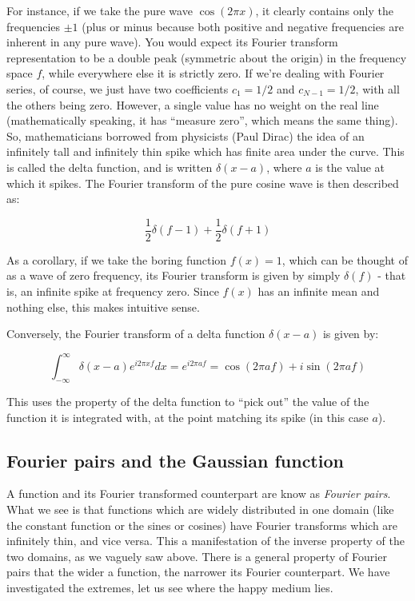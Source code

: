 \documentclass[
  letterpaper,
  DIV=11,
  numbers=noendperiod]{scrreprt}
\begin{document}
For instance, if we take the pure wave \(\cos(2\pi x)\), it clearly
contains only the frequencies \(\pm 1\) (plus or minus because both
positive and negative frequencies are inherent in any pure wave). You
would expect its Fourier transform representation to be a double peak
(symmetric about the origin) in the frequency space \(f\), while
everywhere else it is strictly zero. If we're dealing with Fourier
series, of course, we just have two coefficients \(c_1=1/2\) and
\(c_{N-1} = 1/2\), with all the others being zero. However, a single
value has no weight on the real line (mathematically speaking, it has
``measure zero'', which means the same thing). So, mathematicians
borrowed from physicists (Paul Dirac) the idea of an infinitely tall and
infinitely thin spike which has finite area under the curve. This is
called the delta function, and is written \(\delta(x-a)\), where \(a\)
is the value at which it spikes. The Fourier transform of the pure
cosine wave is then described as:

\[ \frac{1}{2}\delta(f-1) + \frac{1}{2} \delta(f+1)\]

As a corollary, if we take the boring function \(f(x)=1\), which can be
thought of as a wave of zero frequency, its Fourier transform is given
by simply \(\delta(f)\) - that is, an infinite spike at frequency zero.
Since \(f(x)\) has an infinite mean and nothing else, this makes
intuitive sense.

Conversely, the Fourier transform of a delta function \(\delta(x-a)\) is
given by:

\[ 
\int_{-\infty} ^\infty \delta(x-a) e^{i2\pi xf} dx = e^{i2\pi af} = \cos(2\pi af ) + i\sin(2\pi af)
\]

This uses the property of the delta function to ``pick out'' the value
of the function it is integrated with, at the point matching its spike
(in this case \(a\)).

\subsection{Fourier pairs and the Gaussian
function}\label{fourier-pairs-and-the-gaussian-function}

A function and its Fourier transformed counterpart are know as
\emph{Fourier pairs}. What we see is that functions which are widely
distributed in one domain (like the constant function or the sines or
cosines) have Fourier transforms which are infinitely thin, and vice
versa. This a manifestation of the inverse property of the two domains,
as we vaguely saw above. There is a general property of Fourier pairs
that the wider a function, the narrower its Fourier counterpart. We have
investigated the extremes, let us see where the happy medium lies.
\end{document}
